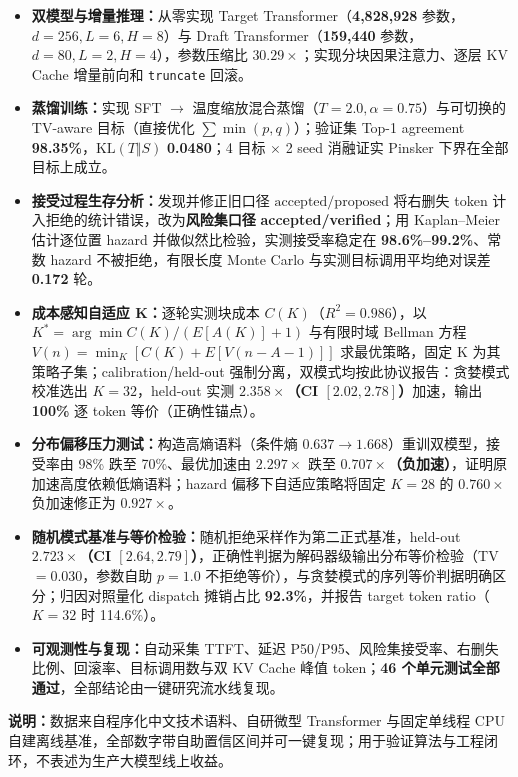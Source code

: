 \documentclass[10pt,a4paper]{ctexart}
\newcommand{\metric}[1]{\textbf{\color{accent}#1}}
\begin{document}
\begin{itemize}
  \item \textbf{双模型与增量推理：}从零实现 Target Transformer（\metric{4,828,928} 参数，$d=256,L=6,H=8$）与 Draft Transformer（\metric{159,440} 参数，$d=80,L=2,H=4$），参数压缩比 \metric{$30.29\times$}；实现分块因果注意力、逐层 KV Cache 增量前向和 \texttt{truncate} 回滚。
  \item \textbf{蒸馏训练：}实现 SFT $\rightarrow$ 温度缩放混合蒸馏（$T=2.0,\alpha=0.75$）与可切换的 TV-aware 目标（直接优化 $\sum\min(p,q)$）；验证集 Top-1 agreement \metric{98.35\%}，$\mathrm{KL}(T\Vert S)$ \metric{0.0480}；4 目标 $\times$ 2 seed 消融证实 Pinsker 下界在全部目标上成立。
  \item \textbf{接受过程生存分析：}发现并修正旧口径 $\text{accepted}/\text{proposed}$ 将右删失 token 计入拒绝的统计错误，改为\textbf{风险集口径} \metric{accepted/verified}；用 Kaplan--Meier 估计逐位置 hazard 并做似然比检验，实测接受率稳定在 \metric{98.6\%--99.2\%}、常数 hazard 不被拒绝，有限长度 Monte Carlo 与实测目标调用平均绝对误差 \metric{0.172} 轮。
  \item \textbf{成本感知自适应 K：}逐轮实测块成本 $C(K)$（$R^2=0.986$），以 $K^*=\arg\min C(K)/(E[A(K)]{+}1)$ 与有限时域 Bellman 方程 $V(n)=\min_K[C(K)+E[V(n{-}A{-}1)]]$ 求最优策略，固定 K 为其策略子集；calibration/held-out 强制分离，双模式均按此协议报告：贪婪模式校准选出 $K{=}32$，held-out 实测 \metric{$2.358\times$（CI $[2.02,2.78]$）}加速，输出 \metric{100\%} 逐 token 等价（正确性锚点）。
  \item \textbf{分布偏移压力测试：}构造高熵语料（条件熵 $0.637{\to}1.668$）重训双模型，接受率由 98\% 跌至 70\%、最优加速由 \metric{$2.297\times$} 跌至 \metric{$0.707\times$（负加速）}，证明原加速高度依赖低熵语料；hazard 偏移下自适应策略将固定 $K{=}28$ 的 $0.760\times$ 负加速修正为 $0.927\times$。
  \item \textbf{随机模式基准与等价检验：}随机拒绝采样作为第二正式基准，held-out \metric{$2.723\times$（CI $[2.64,2.79]$）}，正确性判据为解码器级输出分布等价检验（TV${=}0.030$，参数自助 $p{=}1.0$ 不拒绝等价），与贪婪模式的序列等价判据明确区分；归因对照量化 dispatch 摊销占比 \metric{92.3\%}，并报告 target token ratio（$K{=}32$ 时 114.6\%）。
  \item \textbf{可观测性与复现：}自动采集 TTFT、延迟 P50/P95、风险集接受率、右删失比例、回滚率、目标调用数与双 KV Cache 峰值 token；\textbf{46 个单元测试全部通过}，全部结论由一键研究流水线复现。
\end{itemize}

\vfill
{\footnotesize\color{muted}\textbf{说明：}数据来自程序化中文技术语料、自研微型 Transformer 与固定单线程 CPU 自建离线基准，全部数字带自助置信区间并可一键复现；用于验证算法与工程闭环，不表述为生产大模型线上收益。}
\end{document}
